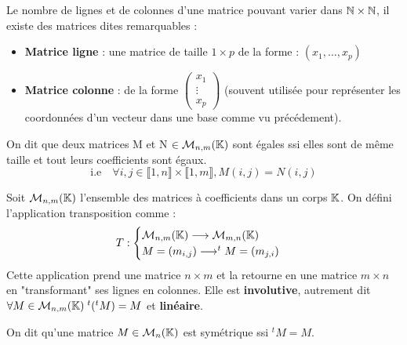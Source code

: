 \begin{proposition}
    Le nombre de lignes et de colonnes d'une matrice pouvant varier dans $\mathbb{N} \times \mathbb{N}$, il existe des 
    matrices dites remarquables : 
    \begin{itemize}
        \item \textbf{Matrice ligne} : une matrice de taille $ 1 \times p$ de la forme : $(x_1, \dots, x_p)$ 
        \item \textbf{Matrice colonne} : de la forme 
        $ \begin{pmatrix}
            x_1 \\ 
            \vdots \\ 
            x_p 
        \end{pmatrix}$ 
        (souvent utilisée pour représenter les coordonnées d'un vecteur dans une base comme vu précédement). 
    \end{itemize} 
\end{proposition}

\begin{proposition}
    On dit que deux matrices M et N $ \in \mathcal{M}_{n,m}(\mathbb{K})$ sont égales ssi elles sont de même taille et 
    tout leurs coefficients sont égaux. 
        \[ \text{i.e} \quad \forall i,j \in \llbracket 1, n \rrbracket \times \llbracket 1, m \rrbracket, M(i,j) = N(i,j) \]  
\end{proposition}

\begin{definition}[Transposition]
    Soit $ \mathcal{M}_{n,m}(\mathbb{K})$ l'ensemble des matrices à coefficients dans un corps $\mathbb{K}$. 
    On défini l'application transposition comme : 
        \[ T : 
            \begin{cases}
                \mathcal{M}_{n,m}(\mathbb{K}) \longrightarrow \mathcal{M}_{m,n}(\mathbb{K}) \\ 
                M = (m_{i,j}) \longrightarrow ^t M = (m_{j,i})
            \end{cases} \]
    Cette application prend une matrice $ n \times m$ et la retourne en une matrice $ m \times n $ en "transformant"
    ses lignes en colonnes. 
    Elle est \textbf{involutive}, autrement dit $ \forall M \in \mathcal{M}_{n,m}(\mathbb{K}) \; ^t (^t M) = M$ 
    et \textbf{linéaire}. 
\end{definition}

\begin{definition}
    On dit qu'une matrice $M \in \mathcal{M}_{n}(\mathbb{K})$ est symétrique ssi $^tM = M$. 
\end{definition}


